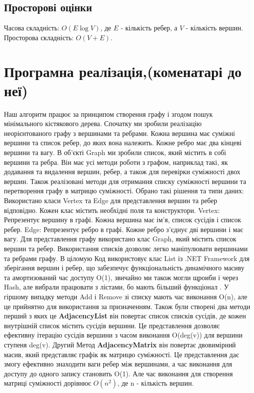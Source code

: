 \documentclass[12pt, letterpaper, twoside]{article}
\begin{document}
\subsection{Просторові оцінки}
Часова складність: \(O(E\log V)\), де \(E\) - кількість ребер, а \(V\) - кількість вершин. Просторова складність: \(O(V+E)\).

\section{Програмна реалізація,(коменатарі до неї)}


Наш алгоритм працює за принципом створення 
графу і згодом пошук мінімального кістякового дерева.
Спочатку ми зробили реалізацію неорієнтованого графу з вершинами та ребрами. Кожна вершина має суміжні вершини та список ребер, до яких вона належить. Кожне ребро має два кінцеві вершини та вагу. В об’єкті Graph ми зробили список, який містить в собі вершини та ребра. Він має усі методи роботи з графом, наприклад такі, як додавання та видалення вершин, ребер, а також для перевірки суміжності двох вершин. Також реалізовані методи для отримання списку суміжності вершини та перетворення графу в матрицю суміжності. 
Обрано такі рішення та типи даних:
Використано класи Vertex та Edge для представлення вершин та ребер відповідно. Кожен клас містить необхідні поля та конструктори.
Vertex: Репрезентує вершину в графі. Кожна вершина має ім'я, список сусідів і список ребер.
Edge: Репрезентує ребро в графі. Кожне ребро з'єднує дві вершини і має вагу.
Для представлення графу використано клас Graph, який містить список вершин та ребер. Використання списків дозволяє легко маніпулювати вершинами та ребрами графу.
В ціломую Код використовує клас List із .NET Framework для зберігання вершин і ребер, що забезпечує функціональність динамічного масиву та амортизований час доступу O(1), звичайно ми також могли щроиби і через Hash, але вибрали працювати з лістами, бо мають більший функціонал . У гіршому випадку методи Add і Remove зі списку мають час виконання O(n), але це прийнятно для використання за призначенням.
Також були створені два методи перший з яких це \textbf {AdjacencyList} він повертає список списків сусідів, де кожен внутрішній список містить сусідів вершини. Це представлення дозволяє ефективну ітерацію сусідів вершини з часом виконання O(deg(v)) для вершини ступеня deg(v).
Другий Метод \textbf{AdjacencyMatrix} він повертає двовимірний масив, який представляє графік як матрицю суміжності. Це представлення дає змогу ефективно знаходити ваги ребер між вершинами, а час виконання для доступу до одного запису становить O(1). Але час виконання для створення матриці суміжності дорівнює $O(n^{2})$, де n - кількість вершин.
\end{document}
